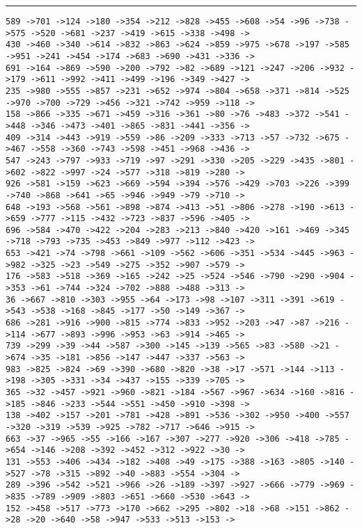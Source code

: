 \documentclass[letter, 12pt]{article}
\newenvironment{question}[1]{%
    \vspace{.2in}%
        \noindent{\bf #1}%
    \vspace{0.3em} \hrule \vspace{.1in}%
}{}
\begin{document}
\begin{question}{\large Appendix}
\begin{lstlisting}[style=CStyle]
589 ->701 ->124 ->180 ->354 ->212 ->828 ->455 ->608 ->54 ->96 ->738 ->575 ->520 ->681 ->237 ->419 ->615 ->338 ->498 ->
430 ->460 ->340 ->614 ->832 ->863 ->624 ->859 ->975 ->678 ->197 ->585 ->951 ->241 ->454 ->174 ->683 ->690 ->431 ->336 ->
691 ->164 ->869 ->590 ->200 ->792 ->82 ->689 ->121 ->247 ->206 ->932 ->179 ->611 ->992 ->411 ->499 ->196 ->349 ->427 ->
235 ->980 ->555 ->857 ->231 ->652 ->974 ->804 ->658 ->371 ->814 ->525 ->970 ->700 ->729 ->456 ->321 ->742 ->959 ->118 ->
158 ->866 ->335 ->671 ->459 ->316 ->361 ->80 ->76 ->483 ->372 ->541 ->448 ->346 ->473 ->401 ->865 ->831 ->441 ->356 ->
409 ->314 ->443 ->919 ->559 ->86 ->209 ->333 ->713 ->57 ->732 ->675 ->467 ->558 ->360 ->743 ->598 ->451 ->968 ->436 ->
547 ->243 ->797 ->933 ->719 ->97 ->291 ->330 ->205 ->229 ->435 ->801 ->602 ->822 ->997 ->24 ->577 ->318 ->819 ->280 ->
926 ->581 ->159 ->623 ->669 ->594 ->394 ->576 ->429 ->703 ->226 ->399 ->740 ->868 ->641 ->65 ->946 ->949 ->79 ->710 ->
648 ->193 ->568 ->561 ->898 ->874 ->413 ->51 ->806 ->278 ->190 ->613 ->659 ->777 ->115 ->432 ->723 ->837 ->596 ->405 ->
696 ->584 ->470 ->422 ->204 ->283 ->213 ->840 ->420 ->161 ->469 ->345 ->718 ->793 ->735 ->453 ->849 ->977 ->112 ->423 ->
653 ->421 ->74 ->798 ->661 ->109 ->562 ->606 ->351 ->534 ->445 ->963 ->982 ->325 ->23 ->549 ->275 ->352 ->907 ->579 ->
176 ->583 ->518 ->369 ->165 ->242 ->25 ->524 ->546 ->790 ->290 ->904 ->353 ->61 ->744 ->324 ->702 ->888 ->488 ->313 ->
36 ->667 ->810 ->303 ->955 ->64 ->173 ->98 ->107 ->311 ->391 ->619 ->543 ->538 ->168 ->845 ->177 ->50 ->149 ->367 ->
686 ->281 ->916 ->900 ->815 ->774 ->833 ->952 ->203 ->47 ->87 ->216 ->114 ->677 ->893 ->996 ->953 ->63 ->914 ->465 ->
739 ->299 ->39 ->44 ->587 ->300 ->145 ->139 ->565 ->83 ->580 ->21 ->674 ->35 ->181 ->856 ->147 ->447 ->337 ->563 ->
983 ->825 ->824 ->69 ->390 ->680 ->820 ->38 ->17 ->571 ->144 ->113 ->198 ->305 ->331 ->34 ->437 ->155 ->339 ->705 ->
365 ->32 ->457 ->921 ->960 ->821 ->184 ->567 ->967 ->634 ->160 ->816 ->185 ->846 ->233 ->544 ->551 ->450 ->910 ->398 ->
138 ->402 ->157 ->201 ->781 ->428 ->891 ->536 ->302 ->950 ->400 ->557 ->320 ->319 ->539 ->925 ->782 ->717 ->646 ->915 ->
663 ->37 ->965 ->55 ->166 ->167 ->307 ->277 ->920 ->306 ->418 ->785 ->654 ->146 ->208 ->392 ->452 ->312 ->922 ->30 ->
131 ->553 ->406 ->434 ->182 ->408 ->49 ->175 ->388 ->163 ->805 ->140 ->527 ->78 ->315 ->892 ->40 ->883 ->554 ->304 ->
289 ->396 ->542 ->521 ->966 ->26 ->189 ->397 ->927 ->666 ->779 ->969 ->835 ->789 ->909 ->803 ->651 ->660 ->530 ->643 ->
152 ->458 ->517 ->773 ->170 ->662 ->295 ->802 ->18 ->68 ->151 ->862 ->28 ->20 ->640 ->58 ->947 ->533 ->513 ->153 ->

\end{lstlisting}
\end{question}
\end{document}
